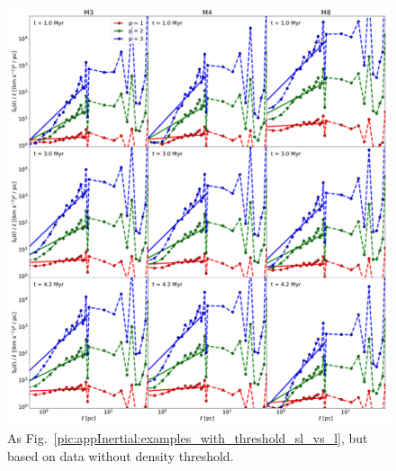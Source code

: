  	
\begin{figure}
    \centering
    \includegraphics[width=\textwidth]{app_examples_woutthres_sl_l.pdf}
    \caption{
        As Fig.~\ref{pic:appInertial:examples_with_threshold_sl_vs_l}, but based on data without density threshold.
    }
    \label{pic:appInertial:examples_without_threshold_sl_vs_l}
\end{figure}



